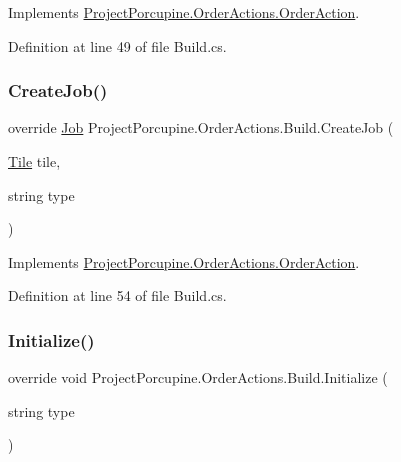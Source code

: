 Implements \hyperlink{class_project_porcupine_1_1_order_actions_1_1_order_action_a34bd9be15055adc6c5397db3aab7bc5f}{Project\+Porcupine.\+Order\+Actions.\+Order\+Action}.



Definition at line 49 of file Build.\+cs.

\mbox{\label{class_project_porcupine_1_1_order_actions_1_1_build_add124f7d8c0cea6ce9c408a4c7d4c284}} 
\subsubsection{\texorpdfstring{Create\+Job()}{CreateJob()}}
{\footnotesize\ttfamily override \hyperlink{class_job}{Job} Project\+Porcupine.\+Order\+Actions.\+Build.\+Create\+Job (\begin{DoxyParamCaption}\item[{\hyperlink{class_tile}{Tile}}]{tile,  }\item[{string}]{type }\end{DoxyParamCaption})\hspace{0.3cm}{\ttfamily [virtual]}}



Implements \hyperlink{class_project_porcupine_1_1_order_actions_1_1_order_action_a84f0d2817e07e351c4a9e86172d8f5b4}{Project\+Porcupine.\+Order\+Actions.\+Order\+Action}.



Definition at line 54 of file Build.\+cs.

\mbox{\label{class_project_porcupine_1_1_order_actions_1_1_build_a84f7280320250c7f7084b8c58693be58}} 
\subsubsection{\texorpdfstring{Initialize()}{Initialize()}}
{\footnotesize\ttfamily override void Project\+Porcupine.\+Order\+Actions.\+Build.\+Initialize (\begin{DoxyParamCaption}\item[{string}]{type }\end{DoxyParamCaption})\hspace{0.3cm}{\ttfamily [virtual]}}



